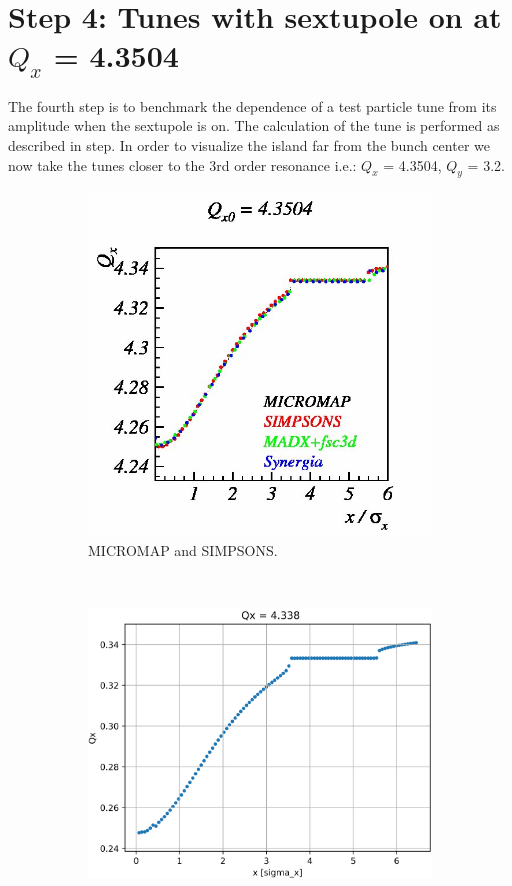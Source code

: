 \documentclass[a4paper]{cernatsnote}
\begin{document}
\section{Step 4: Tunes with sextupole on at $Q_x$ = 4.3504}

The fourth step is to benchmark the dependence of a test particle tune from its amplitude when the sextupole is on. The calculation of the tune is performed as described in step. In order to visualize the island far from the bunch center we now take the tunes closer to the 3rd order resonance i.e.: $Q_x$ = 4.3504, $Q_y$ = 3.2.

\begin{figure}
        \centering
        \begin{subfigure}{.5\textwidth}
          \centering
          \includegraphics[width=\textwidth]{Step4_tune_x.png}
          \caption{MICROMAP and SIMPSONS.}
          \label{fig:step4H_m}
        \end{subfigure}~~~~~~
        \begin{subfigure}{.5\textwidth}
          \centering
          \includegraphics[width=\textwidth]{Step4_tune_x_PO.png}

\end{subfigure}
\end{figure}
\end{document}

